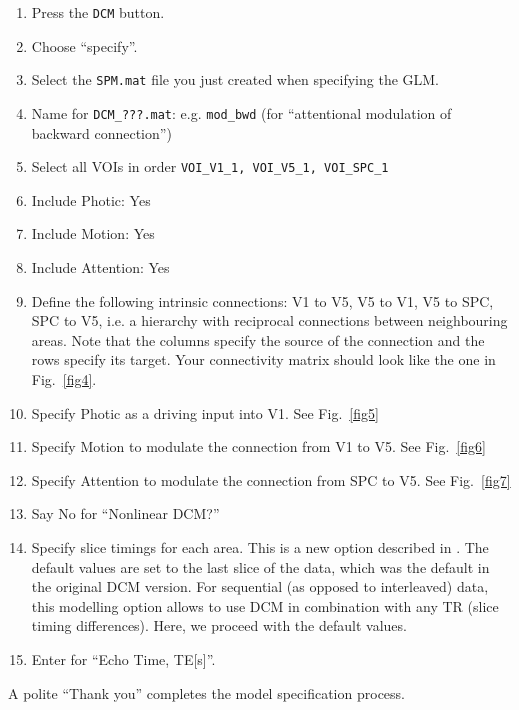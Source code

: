 \begin{enumerate}
\item{Press the \texttt{DCM} button.}
\item{Choose ``specify''.}
\item{Select the \texttt{SPM.mat} file you just created when specifying the GLM.}
\item{Name for \verb!DCM_???.mat!:  e.g. \verb!mod_bwd! (for ``attentional modulation of backward connection'')}
\item{Select all VOIs in order \verb!VOI_V1_1, VOI_V5_1, VOI_SPC_1!}
\item{Include Photic: Yes}
\item{Include Motion: Yes}
\item{Include Attention: Yes}
\item{Define the following intrinsic connections: V1 to V5, V5 to V1, V5 to SPC, SPC to V5, i.e. a hierarchy with reciprocal connections between neighbouring areas. Note that the columns specify the source of the connection and the rows specify its target. Your connectivity matrix should look like the one in Fig.~\ref{fig4}.}
\item{Specify Photic as a driving input into V1.  See Fig.~\ref{fig5}}
\item{Specify Motion to modulate the connection from V1 to V5.  See Fig.~\ref{fig6}}
\item{Specify Attention to modulate the connection from SPC to V5.  See Fig.~\ref{fig7}}
\item{Say No for ``Nonlinear DCM?''}
\item{Specify slice timings for each area. This is a new option described in \cite{sjk_dcm_slicetiming}. The default values are set to the last slice of the data, which was the default in the original DCM version. For sequential (as opposed to interleaved) data, this modelling option allows to use DCM in combination with any TR (slice timing differences). Here, we proceed with the default values.}
\item{Enter \texttt{} for ``Echo Time, TE[s]''.}
\end{enumerate}
A polite ``Thank you'' completes the model specification process. 

